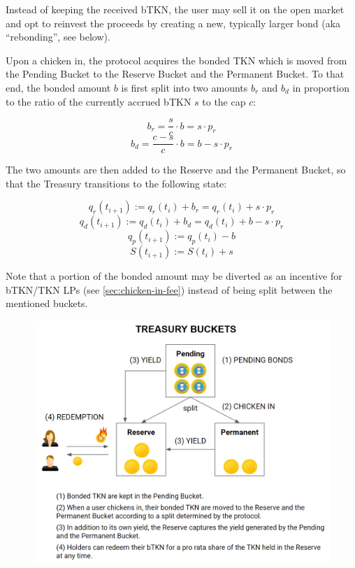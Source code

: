 \documentclass{article}
\begin{document}
Instead of keeping the received bTKN, the user may sell it on the open market and opt to reinvest the proceeds by creating a new, typically larger bond (aka “rebonding”, see below).

Upon a chicken in, the protocol acquires the bonded TKN which is moved from the Pending Bucket to the Reserve Bucket and the Permanent Bucket. To that end, the bonded amount $b$ is first split into two amounts $b_r$ and $b_d$ in proportion to the ratio of the currently accrued bTKN $s$ to the cap $c$:

\begin{equation}
  \label{eq:chicken-in-ba}
    b_r = \frac{s}{c} \cdot b = s \cdot p_r
\end{equation}
\begin{equation}
  \label{eq:chicken-in-bd}
    b_d = \frac{c-s}{c} \cdot b = b - s \cdot p_r
\end{equation}

The two amounts are then added to the Reserve and the Permanent Bucket, so that the Treasury transitions to the following state:

\begin{equation}
  \label{eq:chicken-in-qa}
    q_r(t_{i+1}) := q_r(t_i) + b_r = q_r(t_i) + s \cdot p_r
\end{equation}
\begin{equation}
  \label{eq:chicken-in-qd}
    q_d(t_{i+1}) := q_d(t_i) + b_d = q_d(t_i) + b - s \cdot p_r
\end{equation}
\begin{equation}
  \label{eq:chicken-in-qp}
    q_p(t_{i+1}) := q_p(t_i) - b
\end{equation}
\begin{equation}
  \label{eq:chicken-in-S}
    S(t_{i+1}) := S(t_i) + s
\end{equation}

Note that a portion of the bonded amount may be diverted as an incentive for bTKN/TKN LPs (see \ref{sec:chicken-in-fee}) instead of being split between the mentioned buckets.

\begin{figure}[ht]
    \centering
    \includegraphics[width=0.5\linewidth]{./ChickenBonds_Whitepaper_treasury.png}
\end{figure}
\end{document}
